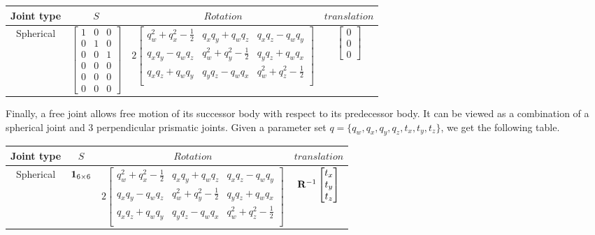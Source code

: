 \begin{table}[ht]
  \centering
  \begin{tabular}{cccc}
    \toprule
    Joint type & $S$ & $Rotation$ & $translation$ \\
    \midrule
    Spherical
    &
    $\begin{bmatrix}
      1 & 0 & 0 \\ 0 & 1 & 0 \\ 0 & 0 & 1 \\ 0 & 0 & 0 \\ 0 & 0 & 0 \\ 0 & 0 & 0
    \end{bmatrix}$
    &
    $2 \begin{bmatrix}
      q_w^2 +q_x^2-\frac{1}{2} & q_x q_y + q_w q_z & q_x q_z - q_w q_y \\
      q_x q_y - q_w q_z & q_w^2 +q_y^2-\frac{1}{2} & q_y q_z + q_w q_x \\
      q_x q_z + q_w q_y & q_y q_z - q_w q_x & q_w^2 +q_z^2-\frac{1}{2} \\
    \end{bmatrix}$
    &
    $\begin{bmatrix}
      0 \\ 0 \\ 0
    \end{bmatrix}$
    \\
    \bottomrule
  \end{tabular}
\end{table}

Finally, a free joint allows free motion of its successor body with respect to its predecessor body.
It can be viewed as a combination of a spherical joint and 3 perpendicular prismatic joints.
Given a parameter set $q = \{ q_w, q_x, q_y, q_z, t_x, t_y, t_z\}$, we get the following table.

\begin{tabular}{cccc}
  \toprule
  Joint type & $S$ & $Rotation$ & $translation$ \\
  \midrule
  Spherical
  &
  ${\bf 1}_{6\times 6}$
  &
  $2 \begin{bmatrix}
    q_w^2 +q_x^2-\frac{1}{2} & q_x q_y + q_w q_z & q_x q_z - q_w q_y \\
    q_x q_y - q_w q_z & q_w^2 +q_y^2-\frac{1}{2} & q_y q_z + q_w q_x \\
    q_x q_z + q_w q_y & q_y q_z - q_w q_x & q_w^2 +q_z^2-\frac{1}{2} \\
  \end{bmatrix}$
  &
  ${\bf R}^{-1}\begin{bmatrix}
    t_x \\ t_y \\ t_z
  \end{bmatrix}$
  \\
  \bottomrule
\end{tabular}




